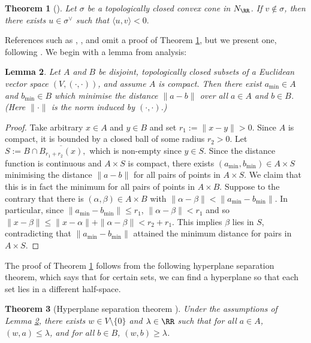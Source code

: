 \documentclass[12pt]{amsart}
\theoremstyle{plain}
\newtheorem{theorem}{Theorem}[subsection]
\newtheorem{lemma}[theorem]{Lemma}
\theoremstyle{definition}
\begin{document}
\begin{theorem}[{\cite[\S 1.2]{Fulton93}}]\label{theorem:dualcone}
Let $\sigma$ be a topologically closed convex cone in $N_\RR$.
If $v \notin \sigma$, then there exists $u \in \sigma^\vee$ such that $\langle u, v \rangle <0.$
\end{theorem}

References such as \cite{Fulton93}, \cite{CLS11}, and \cite{Oda88} omit a proof of Theorem \ref{theorem:dualcone}, but we present one, following \cite{BV04}.
We begin with a lemma from analysis:

\begin{lemma}\label{lemma:mindistance}
Let $A$ and $B$ be disjoint, topologically closed subsets of a Euclidean vector space $(V, (\cdot,\cdot))$, and assume $A$ is compact.
Then there exist $a_{\text{min}} \in A$ and $b_{\text{min}} \in B$ which minimise the distance $\|a-b\|$ over all $a \in A$ and $b \in B$.
(Here $\|\cdot\|$ is the norm induced by $(\cdot,\cdot)$.)
\end{lemma}
\begin{proof}
Take arbitrary $x \in A$ and $y \in B$ and set $r_1 := \|x-y\| > 0$.
Since $A$ is compact, it is bounded by a closed ball of some radius $r_2 > 0$.
Let $S := B \cap \overline{B_{r_1+r_2}(x)},$ which is non-empty since $y \in S$.
Since the distance function is continuous and $A \times S$ is compact, there exists $(a_{\text{min}}, b_{\text{min}}) \in A \times S$ minimising the distance $\|a - b\|$ for all pairs of points in $A \times S$.
We claim that this is in fact the minimum for all pairs of points in $A \times B$.
Suppose to the contrary that there is $(\alpha,\beta) \in A \times B$ with $\|\alpha - \beta\| < \|a_{\text{min}} - b_{\text{min}}\|$. 
In particular, since $\|a_{\text{min}} - b_{\text{min}}\|\le r_1$, $\|\alpha - \beta\| < r_1$ and so
$\|x - \beta\| \le \|x- \alpha\| + \|\alpha - \beta\| < r_2 + r_1.$
This implies $\beta$ lies in $S$, contradicting that $\|a_{\text{min}} - b_{\text{min}}\|$ attained the minimum distance for pairs in $A \times S$.
\end{proof}

The proof of Theorem \ref{theorem:dualcone} follows from the following hyperplane separation theorem, which says that for certain sets, we can find a hyperplane so that each set lies in a different half-space.

\begin{theorem}[Hyperplane separation theorem {\cite[\S 2.5.1]{BV04}}]\label{hyperplaneseparation}
Under the assumptions of Lemma \ref{lemma:mindistance}, there exists $w \in V\setminus\{0\}$ and $\lambda \in \RR$ such that for all $a \in A$, $(w, a) \le \lambda$, and for all $b \in B$, $(w, b) \ge \lambda$.
\end{theorem}
\end{document}
